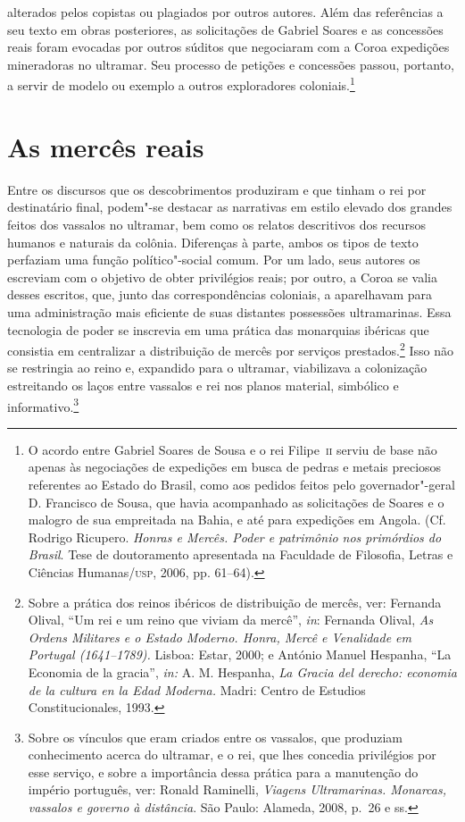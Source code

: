 alterados pelos copistas ou plagiados por outros autores. Além das
referências a seu texto em obras posteriores, as solicitações de
Gabriel Soares e as concessões reais foram evocadas por outros súditos
que negociaram com a Coroa expedições mineradoras no ultramar. Seu
processo de petições e concessões passou, portanto, a servir de modelo
ou exemplo a outros exploradores coloniais.\footnote{ O acordo entre
Gabriel Soares de Sousa e o rei Filipe~\textsc{ii} serviu de base não apenas
às negociações de expedições em busca de pedras e metais preciosos
referentes ao Estado do Brasil, como aos pedidos feitos pelo 
governador"-geral D. Francisco de Sousa, que havia acompanhado as
solicitações de Soares e o malogro de sua empreitada na Bahia, e até
para expedições em Angola. (Cf. Rodrigo Ricupero. \textit{Honras e Mercês.
Poder e patrimônio nos primórdios do Brasil}. Tese de doutoramento apresentada
na Faculdade de Filosofia, Letras e Ciências Humanas/\textsc{usp}, 2006, pp. 61--64).}

\section{As mercês reais}

Entre os discursos que os descobrimentos produziram e que
tinham o rei por destinatário final, podem"-se destacar as narrativas em
estilo elevado dos grandes feitos dos vassalos no ultramar, bem como os
relatos descritivos dos recursos humanos e
naturais da colônia. Diferenças à parte, ambos os tipos de texto
perfaziam uma função político"-social comum. Por um lado, seus autores
os escreviam com o objetivo de obter privilégios reais; por outro, a
Coroa se valia desses escritos, que, junto das correspondências
coloniais, a aparelhavam para uma administração mais eficiente de suas
distantes possessões ultramarinas. Essa tecnologia de poder se
inscrevia em uma prática das monarquias ibéricas que consistia em
centralizar a distribuição de mercês por serviços prestados.\footnote{
Sobre a prática dos reinos ibéricos de distribuição de mercês, ver:
Fernanda Olival, “Um rei e um reino que viviam da mercê”, \textit{in}:
Fernanda Olival, \textit{As Ordens Militares e o Estado
Moderno. Honra, Mercê e Venalidade em Portugal (1641--1789).} Lisboa:
Estar, 2000; e António Manuel Hespanha, “La Economia de la gracia”,
\textit{in:} A. M. Hespanha, \textit{La Gracia del derecho: economia de
la cultura en la Edad Moderna.} Madri: Centro de Estudios
Constitucionales, 1993.} Isso não se restringia ao reino e, expandido
para o ultramar, viabilizava a colonização estreitando os laços entre
vassalos e rei nos planos material, simbólico e informativo.\footnote{Sobre os vínculos que eram criados entre os vassalos, que produziam conhecimento acerca do ultramar, e o rei, que
lhes concedia privilégios por esse serviço, e sobre a importância dessa prática para a manutenção do império
português, ver: Ronald Raminelli, \textit{Viagens Ultramarinas. Monarcas, vassalos e
governo à distância}. São Paulo: Alameda, 2008, p.~26 e ss.}

